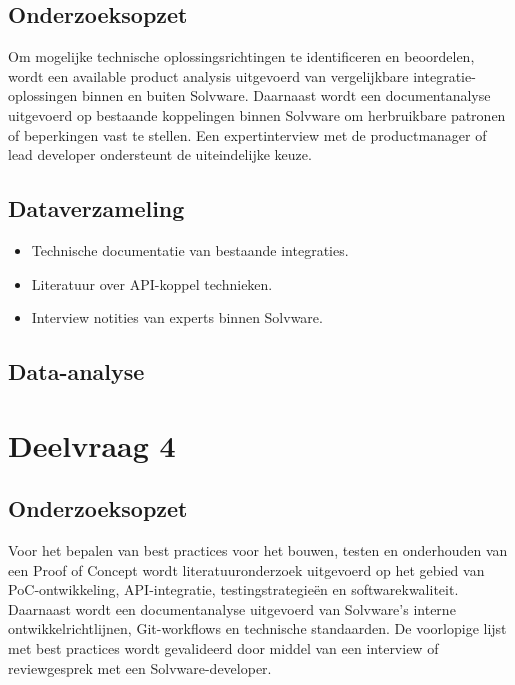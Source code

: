 \subsection{Onderzoeksopzet}
Om mogelijke technische oplossingsrichtingen te identificeren en beoordelen, wordt een available product analysis uitgevoerd van vergelijkbare integratie-oplossingen binnen en buiten Solvware.
Daarnaast wordt een documentanalyse uitgevoerd op bestaande koppelingen binnen Solvware om herbruikbare patronen of beperkingen vast te stellen.
Een expertinterview met de productmanager of lead developer ondersteunt de uiteindelijke keuze.

\subsection{Dataverzameling}
\begin{itemize}
    \item Technische documentatie van bestaande integraties.
    \item Literatuur over API-koppel technieken.
    \item Interview notities van experts binnen Solvware.
\end{itemize}

\subsection{Data-analyse}


\section{Deelvraag 4}

\subsection{Onderzoeksopzet}
Voor het bepalen van best practices voor het bouwen, testen en onderhouden van een Proof of
Concept wordt literatuuronderzoek uitgevoerd op het gebied van PoC‐ontwikkeling, API-integratie,
testingstrategieën en softwarekwaliteit.
Daarnaast wordt een documentanalyse uitgevoerd van Solvware’s interne ontwikkelrichtlijnen, Git-workflows en technische standaarden.
De voorlopige lijst met best practices wordt gevalideerd door middel van een interview of reviewgesprek met een Solvware-developer.
